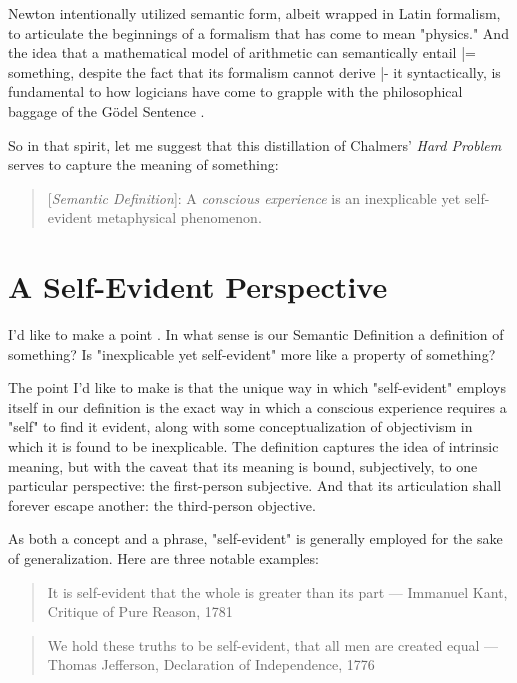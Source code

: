 \documentclass[runningheads]{llncs}
\begin{document}
Newton intentionally utilized semantic form, albeit wrapped in Latin formalism, to articulate the beginnings of a formalism that has come to mean "physics." And the idea that a mathematical model of arithmetic can semantically entail |= something, despite the fact that its formalism cannot derive |- it syntactically, is fundamental to how logicians have come to grapple with the philosophical baggage of the Gödel Sentence \cite{Smullyan1992} \cite{Tarski1935}.

So in that spirit, let me suggest that this distillation of Chalmers' \emph{Hard Problem} serves to capture the meaning of something:

\begin{quote}
[\emph{Semantic Definition}]: A \emph{conscious experience} is an inexplicable yet self-evident metaphysical phenomenon.
\end{quote}

\section{A Self-Evident Perspective}

I'd like to make a point \cite{Reference}. In what sense is our Semantic Definition a definition of something? Is "inexplicable yet self-evident" more like a property of something?

The point I'd like to make \cite{Reference2} is that the unique way in which "self-evident" employs itself in our definition is the exact way in which a conscious experience requires a "self" to find it evident, along with some conceptualization of objectivism in which it is found to be inexplicable. The definition captures the idea of intrinsic meaning, but with the caveat that its meaning is bound, subjectively, to one particular perspective: the first-person subjective. And that its articulation shall forever escape another: the third-person objective.

As both a concept and a phrase, "self-evident" is generally employed for the sake of generalization. Here are three notable examples:

\begin{quote}
It is self-evident that the whole is greater than its part --- Immanuel Kant, Critique of Pure Reason, 1781
\end{quote}

\begin{quote}
We hold these truths to be self-evident, that all men are created equal --- Thomas Jefferson, Declaration of Independence, 1776
\end{quote}
\end{document}
